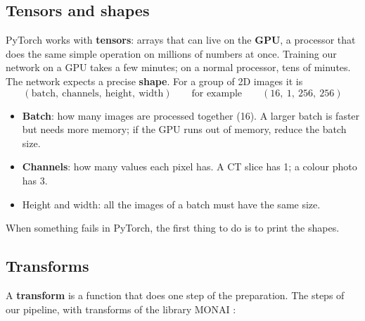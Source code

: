 \documentclass[11pt,a4paper]{article}
\newcommand{\term}[1]{\textbf{#1}}
\begin{document}
\subsection{Tensors and shapes}

PyTorch \cite{paszke2019pytorch} works with \term{tensors}: arrays that can live on the \term{GPU}, a processor that does the
same simple operation on millions of numbers at once. Training our network on a GPU takes a few minutes; on a normal
processor, tens of minutes. The network expects a precise
\term{shape}. For a group of 2D images it is
\[
(\text{batch},\ \text{channels},\ \text{height},\ \text{width}) \qquad\text{for example}\qquad (16,\ 1,\ 256,\ 256)
\]
\begin{center}
\end{center}

\begin{itemize}
\item \term{Batch}: how many images are processed together (16). A larger batch is faster but needs more
memory; if the GPU runs out of memory, reduce the batch size.
\item \term{Channels}: how many values each pixel has. A CT slice has 1; a colour photo has 3.
\item Height and width: all the images of a batch must have the same size.
\end{itemize}
When something fails in PyTorch, the first thing to do is to print the shapes.

\subsection{Transforms}

A \term{transform} is a function that does one step of the preparation. The steps of our pipeline, with transforms of the library MONAI \cite{cardoso2022monai}:
\end{document}
